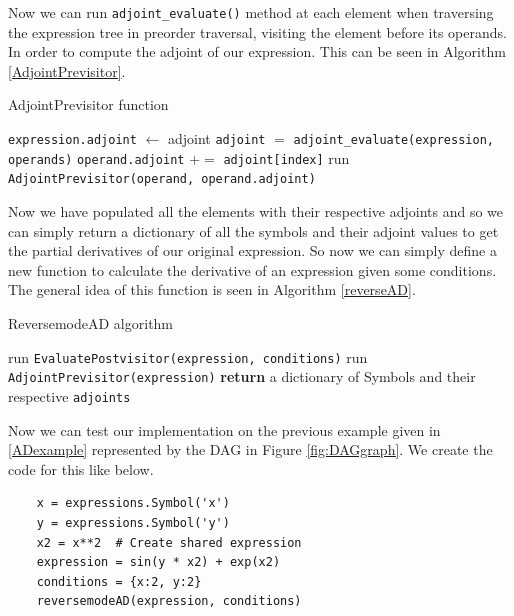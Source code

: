 \documentclass{article}
\begin{document}
Now we can run \verb|adjoint_evaluate()| method at each element when traversing the expression tree in preorder traversal, visiting the element before its operands. In order to compute the adjoint of our expression. This can be seen in Algorithm \ref{AdjointPrevisitor}.

\begin{algorithm}[h]
\caption{AdjointPrevisitor function}\label{AdjointPrevisitor}
\begin{algorithmic}[1]
\State \verb|expression.adjoint| $\gets$ adjoint
\State \verb|adjoint| $=$ \verb|adjoint_evaluate(expression, operands)|
\State \verb|operand.adjoint| $+=$ \verb|adjoint[index]|
\State run \verb|AdjointPrevisitor(operand, operand.adjoint)|
\EndFor
\EndProcedure
\end{algorithmic}
\end{algorithm}

Now we have populated all the elements with their respective adjoints and so we can simply return a dictionary of all the symbols and their adjoint values to get the partial derivatives of our original expression. So now we can simply define a new function to calculate the derivative of an expression given some conditions. The general idea of this function is seen in Algorithm \ref{reverseAD}.

\begin{algorithm}[h]
\caption{ReversemodeAD algorithm}\label{reverseAD}
\begin{algorithmic}[1]
\State run \verb|EvaluatePostvisitor(expression, conditions)|
\State run \verb|AdjointPrevisitor(expression)|
\State \textbf{return} a dictionary of Symbols and their respective \verb|adjoints|
\EndProcedure
\end{algorithmic}
\end{algorithm}

Now we can test our implementation on the previous example given in \eqref{ADexample} represented by the DAG in Figure \ref{fig:DAGgraph}. We create the code for this like below.

\begin{verbatim}
    x = expressions.Symbol('x')
    y = expressions.Symbol('y')
    x2 = x**2  # Create shared expression
    expression = sin(y * x2) + exp(x2)
    conditions = {x:2, y:2}
    reversemodeAD(expression, conditions)
\end{verbatim}
\end{document}
